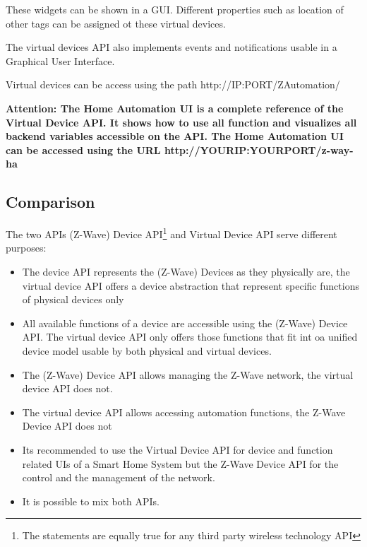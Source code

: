 These widgets can be shown in a GUI. Different properties such as location of other 
tags can be assigned ot these virtual devices.

The virtual devices API also implements events and notifications usable in a Graphical 
User Interface.

Virtual devices can be access using the path http://IP:PORT/ZAutomation/

\textbf{Attention: The Home Automation UI is a complete reference of the Virtual Device API. 
It shows how  to use all function and visualizes all  backend variables accessible on the API.
The Home Automation UI can be accessed using the URL http://YOURIP:YOURPORT/z-way-ha
}

\subsection{Comparison}

The two APIs (Z-Wave) Device API\footnote{The statements are equally true for any third
 party wireless technology API} and Virtual Device API serve different purposes:

\begin{itemize}
\item The device API represents the (Z-Wave) Devices as they physically are, the virtual 
device API offers a device abstraction that represent specific functions of physical devices 
only
\item All available functions of a device are accessible using the (Z-Wave) Device API. 
The virtual device API only offers those functions that fit int oa unified device model 
usable by both physical and virtual devices.
\item The (Z-Wave) Device API allows managing the Z-Wave network, the virtual device API 
does not.
\item The virtual device API allows accessing automation functions, the Z-Wave Device API 
does not
\item Its recommended to use the Virtual Device API for device and function related
UIs of a Smart Home System but the Z-Wave Device API for the control and the management 
of the network.
\item It is possible to mix both APIs.
\end{itemize}





 
